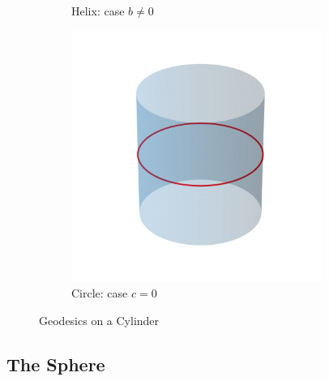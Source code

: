 \documentclass[12pt]{article}
\begin{document}
\begin{figure}[ht]
\begin{subfigure}[b]{0.3\linewidth}
	  \caption{Helix: case $b\neq 0$}
	  \label{subfig:helix}
	\end{subfigure}
	\hfill
	\begin{subfigure}[b]{0.3\linewidth}
	  \centering
	  \includegraphics[width=0.9\textwidth]{images/cylinder_circle.png}
	  \caption{Circle: case $c=0$}
	  \label{subfig:circle}
	\end{subfigure}
	\caption{Geodesics on a Cylinder}
	\label{fig:geodesics-on-cylinder}
\end{figure}
  
\subsection{The Sphere}
\end{document}
